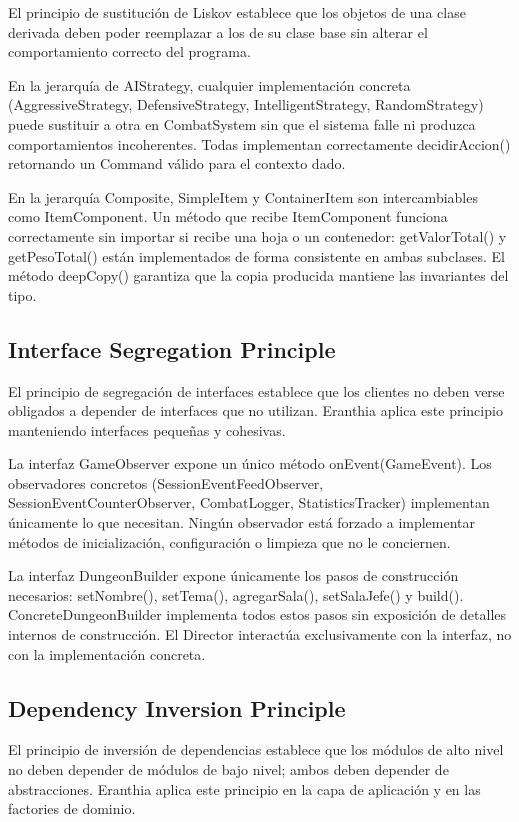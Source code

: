 \documentclass[stu,12pt,floatsintext]{apa7}
\begin{document}
El principio de sustitución de Liskov establece que los objetos de una clase derivada deben poder reemplazar a los de su clase base sin alterar el comportamiento correcto del programa.

En la jerarquía de AIStrategy, cualquier implementación concreta (AggressiveStrategy, DefensiveStrategy, IntelligentStrategy, RandomStrategy) puede sustituir a otra en CombatSystem sin que el sistema falle ni produzca comportamientos incoherentes. Todas implementan correctamente decidirAccion() retornando un Command válido para el contexto dado.

En la jerarquía Composite, SimpleItem y ContainerItem son intercambiables como ItemComponent. Un método que recibe ItemComponent funciona correctamente sin importar si recibe una hoja o un contenedor: getValorTotal() y getPesoTotal() están implementados de forma consistente en ambas subclases. El método deepCopy() garantiza que la copia producida mantiene las invariantes del tipo.

\subsection{Interface Segregation Principle}

El principio de segregación de interfaces establece que los clientes no deben verse obligados a depender de interfaces que no utilizan. Eranthia aplica este principio manteniendo interfaces pequeñas y cohesivas.

La interfaz GameObserver expone un único método onEvent(GameEvent). Los observadores concretos (SessionEventFeedObserver, SessionEventCounterObserver, CombatLogger, StatisticsTracker) implementan únicamente lo que necesitan. Ningún observador está forzado a implementar métodos de inicialización, configuración o limpieza que no le conciernen.

La interfaz DungeonBuilder expone únicamente los pasos de construcción necesarios: setNombre(), setTema(), agregarSala(), setSalaJefe() y build(). ConcreteDungeonBuilder implementa todos estos pasos sin exposición de detalles internos de construcción. El Director interactúa exclusivamente con la interfaz, no con la implementación concreta.

\subsection{Dependency Inversion Principle}

El principio de inversión de dependencias establece que los módulos de alto nivel no deben depender de módulos de bajo nivel; ambos deben depender de abstracciones. Eranthia aplica este principio en la capa de aplicación y en las factories de dominio.
\end{document}
